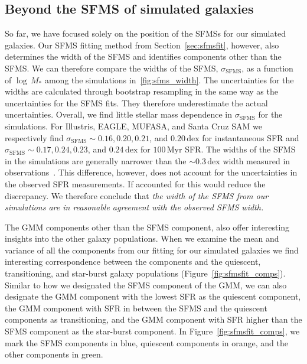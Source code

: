 \documentclass[preprint2,tighten]{aastex62}
\begin{document}
\subsection{Beyond the SFMS of simulated galaxies}
So far, we have focused solely on the position of the SFMSs for our simulated
galaxies. Our SFMS fitting method from Section~\ref{sec:sfmsfit}, however, 
also determines the width of the SFMS and identifies components other than 
the SFMS. We can therefore compare the widths of the SFMS, 
$\sigma_\mathrm{SFMS}$, as a function of $\log\,M_*$ among the simulations
in~\ref{fig:sfms_width}. The uncertainties for the widths are calculated 
through bootstrap resampling in the same way as the uncertainties for the
SFMS fits. They therefore underestimate the actual uncertainties. 
Overall, we find little stellar mass dependence in $\sigma_\mathrm{SFMS}$ 
for the simulations. For Illustris, EAGLE, MUFASA, and Santa Cruz SAM we respectively find 
$\sigma_\mathrm{SFMS} \sim 0.16, 0.20, 0.21$, and $0.20\,\mathrm{dex}$ 
for instantaneous SFR and
$\sigma_\mathrm{SFMS} \sim 0.17, 0.24, 0.23$, and $0.24\,\mathrm{dex}$
for $100\,\mathrm{Myr}$ SFR. The widths of the SFMS in the simulations 
are generally narrower than the $\sim 0.3\,\mathrm{dex}$ width measured
in observations~\citep[\emph{e.g.}][]{daddi2007, noeske2007, magdis10, whittaker12}. 
This difference, however, does not account for the uncertainties in the 
observed SFR measurements. If accounted for this would reduce the 
discrepancy. We therefore conclude that \emph{the width of the SFMS from our 
simulations are in reasonable agreement with the observed SFMS width.}

The GMM components other than the SFMS component, also offer interesting
insights into the other galaxy populations. When we examine the mean and 
variance of all the components from our fitting for our simulated galaxies 
we find interesting correspondence between the components and the quiescent,
transitioning, and star-burst galaxy populations
(Figure~\ref{fig:sfmsfit_comps}).
Similar to how we designated the SFMS component of the GMM, we 
can also designate the GMM component with the lowest SFR as the quiescent 
component, the GMM component with SFR in between the SFMS and the quiescent 
components as transitioning, and the GMM component with SFR higher than the 
SFMS component as the star-burst component. In Figure~\ref{fig:sfmsfit_comps}, 
we mark the SFMS components in blue, quiescent components in orange, and 
the other components in green. 
\end{document}
